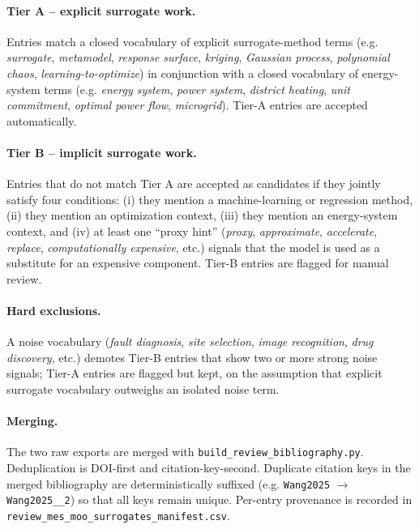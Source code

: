 \paragraph{Tier A -- explicit surrogate work.} Entries match a closed
vocabulary of explicit surrogate-method terms (e.g. \emph{surrogate},
\emph{metamodel}, \emph{response surface}, \emph{kriging}, \emph{Gaussian
process}, \emph{polynomial chaos}, \emph{learning-to-optimize}) in
conjunction with a closed vocabulary of energy-system terms (e.g.
\emph{energy system}, \emph{power system}, \emph{district heating},
\emph{unit commitment}, \emph{optimal power flow}, \emph{microgrid}).
Tier-A entries are accepted automatically.

\paragraph{Tier B -- implicit surrogate work.} Entries that do not match
Tier A are accepted as candidates if they jointly satisfy four
conditions: (i) they mention a machine-learning or regression method,
(ii) they mention an optimization context, (iii) they mention an
energy-system context, and (iv) at least one ``proxy hint''
(\emph{proxy}, \emph{approximate}, \emph{accelerate}, \emph{replace},
\emph{computationally expensive}, etc.) signals that the model is used
as a substitute for an expensive component. Tier-B entries are
flagged for manual review.

\paragraph{Hard exclusions.} A noise vocabulary (\emph{fault diagnosis},
\emph{site selection}, \emph{image recognition}, \emph{drug discovery},
etc.) demotes Tier-B entries that show two or more strong noise
signals; Tier-A entries are flagged but kept, on the assumption that
explicit surrogate vocabulary outweighs an isolated noise term.

\paragraph{Merging.} The two raw exports are merged with
\texttt{build\_review\_bibliography.py}. Deduplication is DOI-first
and citation-key-second. Duplicate citation keys in the merged
bibliography are deterministically suffixed (e.g. \texttt{Wang2025}
$\rightarrow$ \texttt{Wang2025\_\_2}) so that all keys remain unique.
Per-entry provenance is recorded in
\texttt{review\_mes\_moo\_surrogates\_manifest.csv}.

